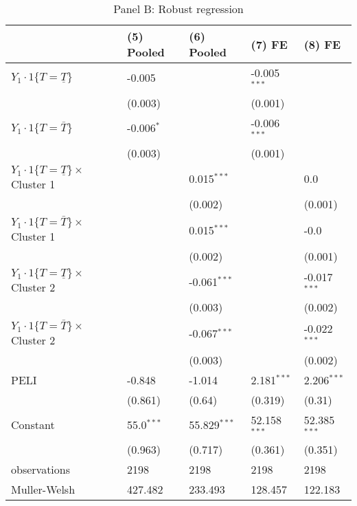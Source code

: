 \documentclass[12pt]{article}
\begin{document}
\begin{table}
    \begin{subtable}{\textwidth}
        \centering
        \captionsetup{justification=centering}
        \caption*{Panel B: Robust regression}
        \begin{tabular}{lllll}
\hline
 & (5) Pooled & (6) Pooled & (7) FE & (8) FE \\
\hline
$Y_1\cdot\text{1}\{T=\underline{T}\}$ & -0.005 &  & -0.005$^{***}$ &  \\
 & (0.003) &  & (0.001) &  \\
$Y_1\cdot\text{1}\{T=\bar{T}\}$ & -0.006$^{*}$ &  & -0.006$^{***}$ &  \\
 & (0.003) &  & (0.001) &  \\
$Y_1\cdot\text{1}\{T=\underline{T}\}\times$ Cluster 1 &  & 0.015$^{***}$ &  & 0.0 \\
 &  & (0.002) &  & (0.001) \\
$Y_1\cdot\text{1}\{T=\bar{T}\}\times$ Cluster 1 &  & 0.015$^{***}$ &  & -0.0 \\
 &  & (0.002) &  & (0.001) \\
$Y_1\cdot\text{1}\{T=\underline{T}\}\times$ Cluster 2 &  & -0.061$^{***}$ &  & -0.017$^{***}$ \\
 &  & (0.003) &  & (0.002) \\
$Y_1\cdot\text{1}\{T=\bar{T}\}\times$ Cluster 2 &  & -0.067$^{***}$ &  & -0.022$^{***}$ \\
 &  & (0.003) &  & (0.002) \\
PELI & -0.848 & -1.014 & 2.181$^{***}$ & 2.206$^{***}$ \\
 & (0.861) & (0.64) & (0.319) & (0.31) \\
Constant & 55.0$^{***}$ & 55.829$^{***}$ & 52.158$^{***}$ & 52.385$^{***}$ \\
 & (0.963) & (0.717) & (0.361) & (0.351) \\\hline

observations & 2198 & 2198 & 2198 & 2198 \\
Muller-Welsh & 427.482 & 233.493 & 128.457 & 122.183 \\
\hline
\end{tabular}
    \end{subtable} 


\end{table}
\end{document}
